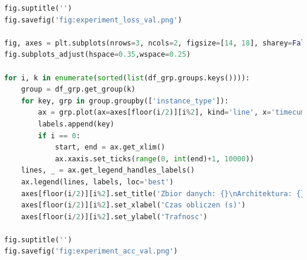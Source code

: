 \documentclass[12pt,a4paper,twoside]{article}
\begin{document}
\begin{appendices}
\begin{lstlisting}[language=python]
fig.suptitle('')
fig.savefig('fig:experiment_loss_val.png')

fig, axes = plt.subplots(nrows=3, ncols=2, figsize=[14, 18], sharey=False)
fig.subplots_adjust(hspace=0.35,wspace=0.25)

for i, k in enumerate(sorted(list(df_grp.groups.keys()))):
    group = df_grp.get_group(k)
    for key, grp in group.groupby(['instance_type']):
        ax = grp.plot(ax=axes[floor(i/2)][i%2], kind='line', x='timecum', y='val_acc', c='black', ls=lsd.get(key))
        labels.append(key)
        if i == 0:
            start, end = ax.get_xlim()
            ax.xaxis.set_ticks(range(0, int(end)+1, 10000))
    lines, _ = ax.get_legend_handles_labels()
    ax.legend(lines, labels, loc='best')
    axes[floor(i/2)][i%2].set_title('Zbior danych: {}\nArchitektura: {}'.format(k.split('_')[0], k.split('_')[1]))
    axes[floor(i/2)][i%2].set_xlabel('Czas obliczen (s)')
    axes[floor(i/2)][i%2].set_ylabel('Trafnosc')

fig.suptitle('')
fig.savefig('fig:experiment_acc_val.png')

\end{lstlisting}
\end{appendices}
\clearpage
\end{document}
